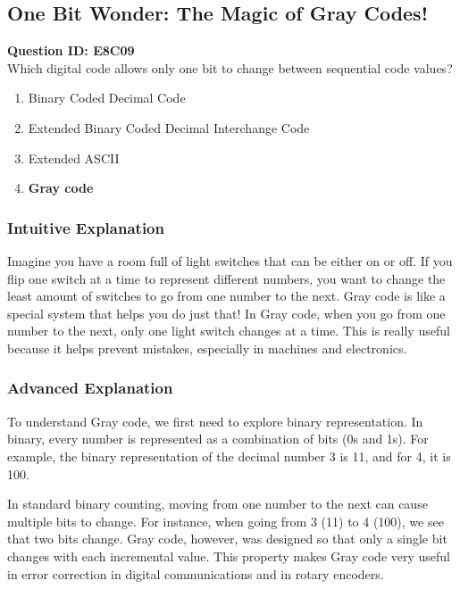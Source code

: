 \subsection{One Bit Wonder: The Magic of Gray Codes!}

\begin{tcolorbox}[colback=blue!5!white, colframe=blue!75!black, title=E8C09]
    \textbf{Question ID: E8C09} \\
    Which digital code allows only one bit to change between sequential code values?
    \begin{enumerate}[label=\Alph*.]
        \item Binary Coded Decimal Code
        \item Extended Binary Coded Decimal Interchange Code
        \item Extended ASCII
        \item \textbf{Gray code}
    \end{enumerate}
\end{tcolorbox}

\subsubsection{Intuitive Explanation}
Imagine you have a room full of light switches that can be either on or off. If you flip one switch at a time to represent different numbers, you want to change the least amount of switches to go from one number to the next. Gray code is like a special system that helps you do just that! In Gray code, when you go from one number to the next, only one light switch changes at a time. This is really useful because it helps prevent mistakes, especially in machines and electronics.

\subsubsection{Advanced Explanation}
To understand Gray code, we first need to explore binary representation. In binary, every number is represented as a combination of bits (0s and 1s). For example, the binary representation of the decimal number 3 is 11, and for 4, it is 100. 

In standard binary counting, moving from one number to the next can cause multiple bits to change. For instance, when going from 3 (11) to 4 (100), we see that two bits change. Gray code, however, was designed so that only a single bit changes with each incremental value. This property makes Gray code very useful in error correction in digital communications and in rotary encoders.

